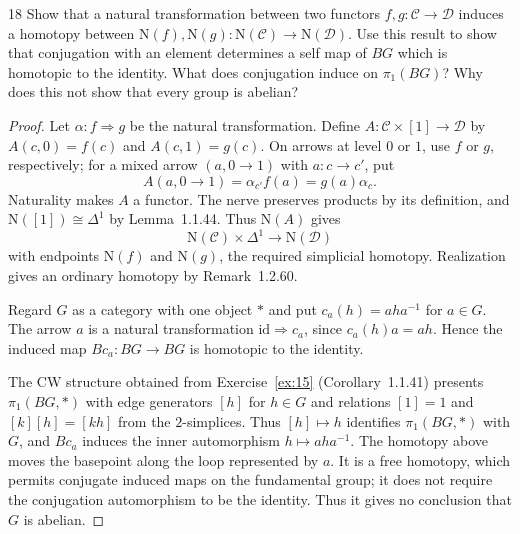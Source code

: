 \begin{exercise}{18}
Show that a natural transformation between two functors
$f,g\colon\mathcal C\to\mathcal D$ induces a homotopy between
$\mathrm N(f),\mathrm N(g)\colon\mathrm N(\mathcal C)\to
\mathrm N(\mathcal D)$. Use this result to show that conjugation
with an element determines a self map of $BG$ which is homotopic
to the identity. What does conjugation induce on $\pi_1(BG)$?
Why does this not show that every group is abelian?

\begin{proof}
Let $\alpha\colon f\Rightarrow g$ be the natural transformation.
Define $A\colon\mathcal C\times[1]\to\mathcal D$ by
$A(c,0)=f(c)$ and $A(c,1)=g(c)$. On arrows at level $0$ or $1$,
use $f$ or $g$, respectively; for a mixed arrow $(a,0\to1)$ with
$a\colon c\to c'$, put
\[
 A(a,0\to1)=\alpha_{c'}f(a)=g(a)\alpha_c.
\]
Naturality makes $A$ a functor. The nerve preserves products by
its definition, and $\mathrm N([1])\cong\Delta^1$ by
Lemma~1.1.44. Thus $\mathrm N(A)$ gives
\[
 \mathrm N(\mathcal C)\times\Delta^1\longrightarrow
 \mathrm N(\mathcal D)
\]
with endpoints $\mathrm N(f)$ and $\mathrm N(g)$, the required
simplicial homotopy. Realization gives an ordinary homotopy by
Remark~1.2.60.

Regard $G$ as a category with one object $*$ and put
$c_a(h)=aha^{-1}$ for $a\in G$.
The arrow $a$ is a natural transformation
$\mathrm{id}\Rightarrow c_a$, since $c_a(h)a=ah$.
Hence the induced map $Bc_a\colon BG\to BG$ is homotopic to the
identity.

The CW structure obtained from Exercise~\ref{ex:15}
(Corollary~1.1.41) presents $\pi_1(BG,*)$ with
edge generators $[h]$ for $h\in G$ and relations
$[1]=1$ and $[k][h]=[kh]$ from the $2$-simplices.
Thus $[h]\mapsto h$ identifies $\pi_1(BG,*)$ with $G$, and
$Bc_a$ induces the inner automorphism $h\mapsto aha^{-1}$.
The homotopy above moves the basepoint along the loop represented
by $a$. It is a free homotopy, which permits conjugate induced maps
on the fundamental group; it does not require the conjugation
automorphism to be the identity. Thus it gives no conclusion that
$G$ is abelian.
\end{proof}
\end{exercise}
